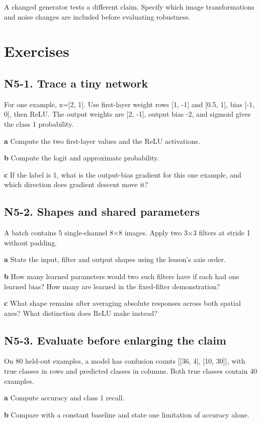 \documentclass[11pt,letterpaper]{article}
\theoremstyle{definition}\newtheorem{definition}{Definition}\newtheorem{example}{Example}
\numberwithin{equation}{section}
\begin{document}
A changed generator tests a different claim. Specify which image transformations and noise changes are included before evaluating robustness.
\bigskip
\section*{Exercises}
\par\noindent\begin{minipage}{\linewidth}
\subsection*{N5-1. Trace a tiny network}
For one example, x=\allowbreak{}[2, 1]. Use first-layer weight rows [1, -1] and [0.5, 1], bias [-1, 0], then ReLU. The output weights are [2, -1], output bias -2, and sigmoid gives the class 1 probability.

\textbf{a} Compute the two first-layer values and the ReLU activations.

\end{minipage}\par\medskip
\textbf{b} Compute the logit and approximate probability.

\textbf{c} If the label is 1, what is the output-bias gradient for this one example, and which direction does gradient descent move it?

\par\noindent\begin{minipage}{\linewidth}
\subsection*{N5-2. Shapes and shared parameters}
A batch contains 5 single-channel 8$\times$8 images. Apply two 3$\times$3 filters at stride 1 without padding.

\textbf{a} State the input, filter and output shapes using the lesson's axis order.

\end{minipage}\par\medskip
\textbf{b} How many learned parameters would two such filters have if each had one learned bias? How many are learned in the fixed-filter demonstration?

\textbf{c} What shape remains after averaging absolute responses across both spatial axes? What distinction does ReLU make instead?

\par\noindent\begin{minipage}{\linewidth}
\subsection*{N5-3. Evaluate before enlarging the claim}
On 80 held-out examples, a model has confusion counts [[36, 4], [10, 30]], with true classes in rows and predicted classes in columns. Both true classes contain 40 examples.

\textbf{a} Compute accuracy and class 1 recall.

\end{minipage}\par\medskip
\textbf{b} Compare with a constant baseline and state one limitation of accuracy alone.
\end{document}

